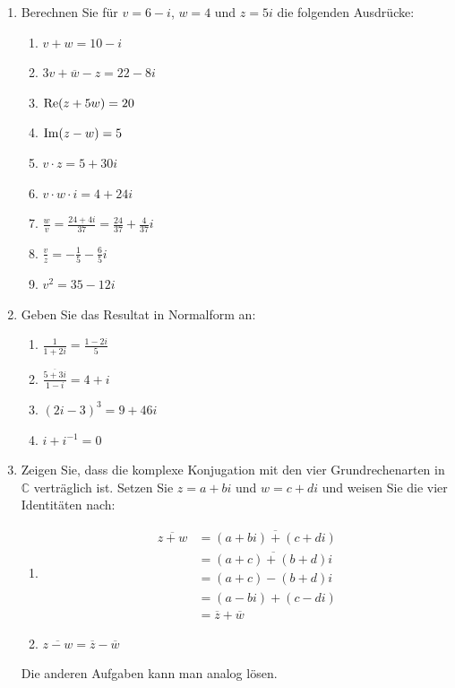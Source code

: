 \begin{enumerate}
    \item Berechnen Sie für $v=6-i$, $w=4$ und $z=5i$ die folgenden Ausdrücke:
    \begin{enumerate}
        \item $v+w= 10 - i$
        \item $3v+\overline{w}-z= 22 - 8i$
        \item $\mathrm{Re}(z+5w)= 20$ 
        \item $\mathrm{Im}(z-w)= 5$
        \item $v\cdot z= 5+30i$
        \item $v\cdot w\cdot i= 4 + 24i$
        \item $\frac{w}{v}= \frac{24 + 4i}{37} = \frac{24}{37}+\frac{4}{37}i$
        \item $\frac{v}{z}= -\frac{1}{5} -\frac{6}{5}i$
        \item $v^2= 35-12i$
    \end{enumerate}
    
    \item Geben Sie das Resultat in Normalform an:
    \begin{enumerate}
        \item $\frac{1}{1+2i}= \frac{1-2i}{5}$
        \item $\frac{\overline{5+3i}}{1-i}= 4+i$
        \item $(2i-3)^3= 9 + 46i$
        \item $i+i^{-1}= 0$
    \end{enumerate}
    
    \item Zeigen Sie, dass die komplexe Konjugation mit den vier Grundrechenarten in $\mathbb{C}$ verträglich ist. Setzen Sie $z= a + bi$ und $w=c+di$ und weisen Sie die vier Identitäten nach:
    \begin{enumerate}
        \item \begin{align*}
            \overline{z+w} &= \overline{(a+bi)+(c+di)}\\
                            & =\overline{(a+c) +(b+d)i }\\
                            &= (a+c) - (b+d)i \\
                            &= (a-bi) + (c-di)\\
                            & = \overline{z} + \overline{w} 
        \end{align*} 
        \item $\overline{z-w}= \overline{z} - \overline{w}$
    \end{enumerate}
    Die anderen Aufgaben kann man analog lösen.
    

\end{enumerate}
